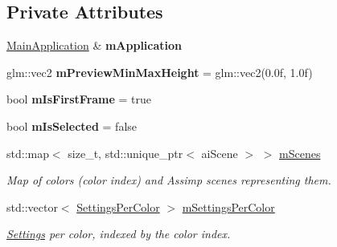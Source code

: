 \subsection*{Private Attributes}
\begin{DoxyCompactItemize}
\item 
\mbox{\label{classpepr3d_1_1_export_assistant_a0d189d2736a0d8885470acd5249be346}} 
\mbox{\hyperlink{classpepr3d_1_1_main_application}{Main\+Application}} \& {\bfseries m\+Application}
\item 
\mbox{\label{classpepr3d_1_1_export_assistant_a0d2833668f741000b55a72fff4962df3}} 
glm\+::vec2 {\bfseries m\+Preview\+Min\+Max\+Height} = glm\+::vec2(0.\+0f, 1.\+0f)
\item 
\mbox{\label{classpepr3d_1_1_export_assistant_a6184c3ee081e787e9749405c647f259d}} 
bool {\bfseries m\+Is\+First\+Frame} = true
\item 
\mbox{\label{classpepr3d_1_1_export_assistant_aa444c180b7ee9cde1e438c79d37d65a0}} 
bool {\bfseries m\+Is\+Selected} = false
\item 
\mbox{\label{classpepr3d_1_1_export_assistant_a99f3d21c6f76c3443376680951cceed7}} 
std\+::map$<$ size\+\_\+t, std\+::unique\+\_\+ptr$<$ ai\+Scene $>$ $>$ \mbox{\hyperlink{classpepr3d_1_1_export_assistant_a99f3d21c6f76c3443376680951cceed7}{m\+Scenes}}
\begin{DoxyCompactList}\small\item\em Map of colors (color index) and Assimp scenes representing them. \end{DoxyCompactList}\item 
\mbox{\label{classpepr3d_1_1_export_assistant_ab047792af2173b6a30121db9e6100843}} 
std\+::vector$<$ \mbox{\hyperlink{structpepr3d_1_1_export_assistant_1_1_settings_per_color}{Settings\+Per\+Color}} $>$ \mbox{\hyperlink{classpepr3d_1_1_export_assistant_ab047792af2173b6a30121db9e6100843}{m\+Settings\+Per\+Color}}
\begin{DoxyCompactList}\small\item\em \mbox{\hyperlink{classpepr3d_1_1_settings}{Settings}} per color, indexed by the color index. \end{DoxyCompactList}\item 

\end{DoxyCompactItemize}
